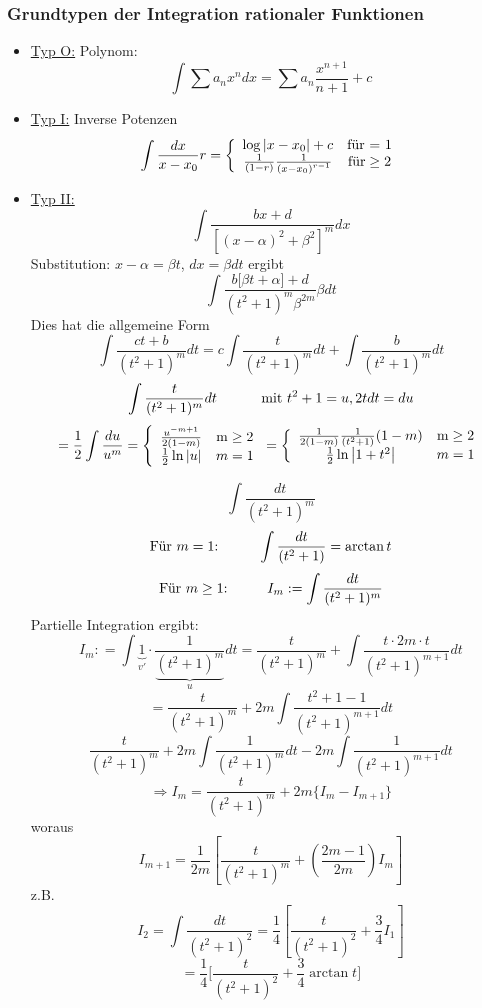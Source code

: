 \subsubsection*{Grundtypen der Integration rationaler Funktionen}
\begin{itemize}
\item \underline{Typ O:} Polynom: $$\int \sum a_{n}x^{n}dx=\sum a_{n}\dfrac {x^{n+1}}{n+1}+c$$
\item \underline{Typ I:} Inverse Potenzen \[\int {\frac{{dx}}{{x - {x_0}}}r}  = \left\{ {\begin{array}{*{20}{c}}
{\log \left| {x - {x_0}} \right| + c}&{{\text{für = 1}}}\\
{\frac{1}{{(1 - r)}}\frac{1}{{{{(x - {x_0})}^{r - 1}}}}}&{{\text{für}} \ge {\rm{2}}}
\end{array}} \right.\]

\item \underline{Typ II:}
$$\int { \dfrac {bx+d}{\left[ \left( x-\alpha \right) ^{2}+\beta ^{2}\right] ^{m}}dx}$$
Substitution: $x-\alpha =\beta t$, $dx=\beta dt$ ergibt $$\int {\dfrac {b\lbrack \beta t+\alpha\rbrack +d}{(t^2 +1)^m \beta ^{2m}} \beta dt}$$ Dies hat die allgemeine Form $$\int{\frac{ct+b}{(t^2+1)^m}dt}=c\int{\frac{t}{(t^2 +1)^m}dt}+\int{\frac{b}{(t^2 +1)^m} dt}$$
$$\int{\frac{t}{(t^2 +1)^m}dt}\text{\hspace{10mm} mit }t^2+1=u, 2t dt=du$$
$$=\frac{1}{2}\int{\frac{du}{u^m}} = \left\{ {\begin{array}{*{20}{c}}
{\frac{{{u^{ - m + 1}}}}{{2(1 - m)}}}&{{\rm{m}} \ge 2}\\
{\frac{1}{2}\ln \left| u \right|}&{m = 1}
\end{array}} \right. = \left\{ {\begin{array}{*{20}{c}}
{\frac{1}{{2(1 - m)}}\frac{1}{{({t^2} + 1)}}(1 - m)}&{{\rm{m}} \ge 2}\\
{\frac{1}{2}\ln \left| {1 + {t^2}} \right|}&{m = 1}
\end{array}} \right.$$

$$\int{\frac{dt}{(t^2 +1)^m}}$$
$$\text{Für $m=1$:\hspace{10mm}}\int{\frac{dt}{(t^2 +1)}}=\arctan t$$
$$\text{Für $m\geq1$:\hspace{10mm}}I_m:=\int{\frac{dt}{(t^2 +1)^m}}$$
Partielle Integration ergibt:
\[{I_m}: = \int {\underbrace 1_{v'} \cdot \frac{1}{{\underbrace {{{({t^2} + 1)}^m}}_u}}dt}  = \frac{t}{{{{({t^2} + 1)}^m}}} + \int {\frac{{t \cdot 2m \cdot t}}{{{{({t^2} + 1)}^{m + 1}}}}dt} \]
$$=\frac{t}{(t^2 +1)^m} + 2m\int{\frac{t^2 +1-1}{(t^2 +1)^{m+1}}dt}$$
$$\frac{t}{(t^2 +1)^m}+2m\int{\frac{1}{(t^2 +1)^m}dt}-2m\int{\frac{1}{(t^2 +1)^{m+1}}dt}$$
$$\Rightarrow I_m=\frac{t}{(t^2 +1)^m}+2m\{ I_m - I_{m+1} \}$$
woraus $$I_{m+1}=\frac{1}{2m}\left[\frac{t}{(t^2 +1)^m} + \left(\frac{2m-1}{2m}\right)I_m\right]$$
z.B.$$I_2=\int{\frac{dt}{(t^2 +1)^2}}=\frac{1}{4}\left[ \frac{t}{(t^2 +1)^2}+\frac{3}{4}I_1\right]$$
$$=\frac{1}{4}\lbrack \frac{t}{(t^2 +1)^2}+\frac{3}{4}\arctan t\rbrack$$
\end{itemize}
